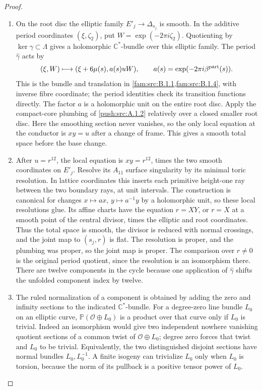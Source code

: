 \begin{proof}
\begin{enumerate}[label=\arabic*.,leftmargin=*]
\item On the root disc the elliptic family $E'_j\to\Delta_{s_j}$ is
smooth. In the additive period coordinates $(\xi,\zeta_2)$,
put $W=\exp(-2\pi i\zeta_2)$. Quotienting by
$\ker\gamma\subset\Lambda$ gives a holomorphic
$\mathbb C^*$-bundle over this elliptic family. The period
$\widehat\gamma$ acts by
\[
 (\xi,W)\longmapsto
 (\xi+6\mu(s),a(s)uW),\qquad
 a(s)=\exp(-2\pi i\beta^{\rm part}(s)).
\]
This is the bundle and translation in \cref{fam:src:B.1.1,fam:src:B.1.4}, with inverse fibre
coordinate; the period identities check its transition
functions directly. The factor $a$ is a holomorphic unit on
the entire root disc. Apply the compact-core plumbing of
\ref{push:src:A.1.2} relatively over a closed smaller root disc. Here the
smoothing section never vanishes, so the only local equation
at the conductor is $xy=u$ after a change of frame. This
gives a smooth total space before the base change.

\item After $u=r^{12}$, the local equation is $xy=r^{12}$,
times the two smooth coordinates on $E'_j$. Resolve its
$A_{11}$ surface singularity by its minimal toric resolution.
In lattice coordinates this inserts each primitive height-one
ray between the two boundary rays, at unit intervals. The
construction is canonical for changes $x\mapsto a x$,
$y\mapsto a^{-1}y$ by a holomorphic unit, so these local
resolutions glue. Its affine charts have the equation
$r=XY$, or $r=X$ at a smooth point of the central divisor,
times the elliptic and root coordinates. Thus the total space
is smooth, the divisor is reduced with normal crossings, and
the joint map to $(s_j,r)$ is flat. The resolution is proper,
and the plumbing was proper, so the joint map is proper.
The comparison over $r\ne0$ is the original period quotient,
since the resolution is an isomorphism there. There are
twelve components in the cycle because one application of
$\widehat\gamma$ shifts the unfolded component index by
twelve.

\item The ruled normalization of a component is obtained by adding
the zero and infinity sections to the indicated
$\mathbb C^*$-bundle. For a degree-zero line bundle $L_0$
on an elliptic curve, $\mathbb P(\mathcal O\oplus L_0)$
is a product over that curve only if $L_0$ is trivial.
Indeed an isomorphism would give two independent nowhere
vanishing quotient sections of a common twist of
$\mathcal O\oplus L_0$; degree zero forces that twist and
$L_0$ to be trivial. Equivalently, the two distinguished
disjoint sections have normal bundles $L_0,L_0^{-1}$.
A finite isogeny can trivialize $L_0$ only when $L_0$ is
torsion, because the norm of its pullback is a positive
tensor power of $L_0$.


\end{enumerate}
\end{proof}
